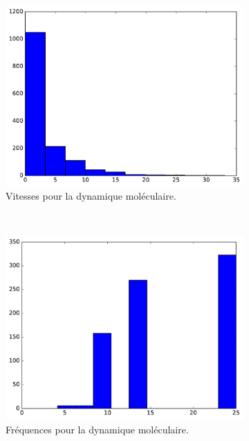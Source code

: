 	\begin{figure}[htb]
		\begin{subfigure}[t]{\subImgWaStats}
			\centering
			\includegraphics[width=\textwidth]{figures/ch3/atom_speed}
			\caption{Vitesses pour la dynamique moléculaire.}
			\label{fig:atom_speed}
		\end{subfigure}
		~
		\begin{subfigure}[t]{\subImgWaStats}
			\centering
			\includegraphics[width=\textwidth]{figures/ch3/atom_frequency}
			\caption{Fréquences pour la dynamique moléculaire.}
			\label{fig:atom_frequency}
		\end{subfigure}
		~
		\begin{subfigure}[t]{\subImgWaStats}

\end{subfigure}
\end{figure}
